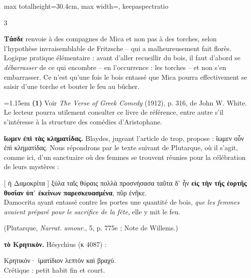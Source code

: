 \documentclass[11pt,twoside]{book}
\newcommand{\italique}[1]{\textit{#1}}
\newcommand{\citComm}[1]{\begin{quoting}[vskip=0.4pt,leftmargin=0.7em,rightmargin=0.2em]#1\end{quoting}}
\newcommand{\francais}[1]{{\policeFr #1}}
\begin{document}
\begin{adjustbox}{max totalheight=30.4cm, max width=\textwidth, keepaspectratio}
\begin{minipage}{\textwidth}
{\begin{multicols}{3}
\par\vspace{1.5pt}
 \textbf{Τάσδε} renvoie à des compagnes de Mica et non pas à des torches, selon l'hypothèse invraisemblable de Fritzsche -- qui a malheureusement fait florès. Logique pratique élémentaire : avant d'aller recueillir du bois, il faut d'abord se \italique{débarrasser} de ce qui encombre -- en l'occurrence : les torches -- et non s'en embarrasser. Ce n'est qu'une fois le bois entassé que Mica pourra effectivement se saisir d'une torche et bouter le feu au bûcher.
\par\vspace{1.5pt}
\par\vspace{1.2pt}\par\nopagebreak\vspace{1pt}\noindent\hangindent=1.15em {\color{sepiaNote}\textbf{(1)}} Voir \italique{The Verse of Greek Comedy} (1912), p. 316, de John W. White. Le lecteur pourra utilement consulter ce livre de référence, entre autre s'il s'intéresse à la structure des comédies d'Aristophane.
\par\vspace{1.5pt}
 \textbf{ἴωμεν ἐπὶ τὰς κληματίδας.} Blaydes, jugeant l'article de trop, propose : ἴωμεν οὖν ἐπὶ κληματίδας. Nous répondrons par le texte suivant de Plutarque, où il s'agit, comme ici, d'un sanctuaire où des femmes se trouvent réunies pour la célébration de leurs mystères :
\citComm{$[$ ἡ Δαμοκρίτα $]$ ξύλα ταῖς θύραις πολλὰ προσνήσασα ταῦτα δ᾽ ἦν \textbf{εἰς τὴν τῆς ἑορτῆς θυσίαν ὑπ᾽ ἐκείνων παρεσκευασμένα}, πῦρ ἐνῆκε.\\
Damocrita ayant entassé contre les portes une quantité de bois, \italique{que les femmes avaient préparé pour le sacrifice de la fête}, elle y mit le feu.}
\par\vspace{1.5pt}
\noindent (Plutarque, \italique{Narrat. amour}., 5, p. 775e ; Note de Willems.)
\par\vspace{1.5pt}
 \textbf{τὸ Κρητικὸν.} Hésychius (κ 4087) :
\citComm{Κρητικόν· ἱματίδιον λεπτὸν καὶ βραχύ.\\
\francais{Crétique : petit habit fin et court.}}
\par\vspace{1.5pt}

\end{multicols}}
\end{minipage}
\end{adjustbox}
\end{document}
